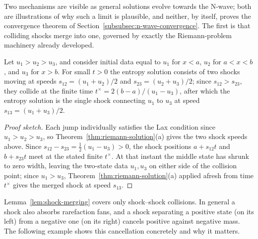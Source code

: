Two mechanisms are visible as general solutions evolve towards the
N-wave; both are illustrations of why such a limit is plausible, and
neither, by itself, proves the convergence theorem of
Section~\ref{subsubsec:n-wave-convergence}. The first is that colliding
shocks merge into one, governed by exactly the Riemann-problem machinery
already developed.

\begin{lemma}
\label{lem:shock-merging}
Let $u_1>u_2>u_3$, and consider initial data equal to $u_1$ for $x<a$,
$u_2$ for $a<x<b$, and $u_3$ for $x>b$. For small $t>0$ the entropy
solution consists of two shocks moving at speeds $s_{12}=(u_1+u_2)/2$
and $s_{23}=(u_2+u_3)/2$; since $s_{12}>s_{23}$, they collide at the
finite time $t^\times = 2(b-a)/(u_1-u_3)$, after which the entropy
solution is the single shock connecting $u_1$ to $u_3$ at speed
$s_{13}=(u_1+u_3)/2$.
\end{lemma}

\begin{proof}[Proof sketch]
Each jump individually satisfies the Lax condition since
$u_1>u_2>u_3$, so Theorem~\ref{thm:riemann-solution}(a) gives the two
shock speeds above. Since $s_{12}-s_{23}=\tfrac12(u_1-u_3)>0$, the shock
positions $a+s_{12}t$ and $b+s_{23}t$ meet at the stated finite
$t^\times$. At that instant the middle state has shrunk to zero width,
leaving the two-state data $u_1,u_3$ on either side of the collision
point; since $u_1>u_3$, Theorem~\ref{thm:riemann-solution}(a) applied
afresh from time $t^\times$ gives the merged shock at speed $s_{13}$.
\end{proof}

\begin{remark}
Lemma~\ref{lem:shock-merging} covers only shock--shock collisions. In
general a shock also absorbs rarefaction fans, and a shock separating a
positive state (on its left) from a negative one (on its right) cancels
positive against negative mass. The following example shows this
cancellation concretely and why it matters.
\end{remark}

